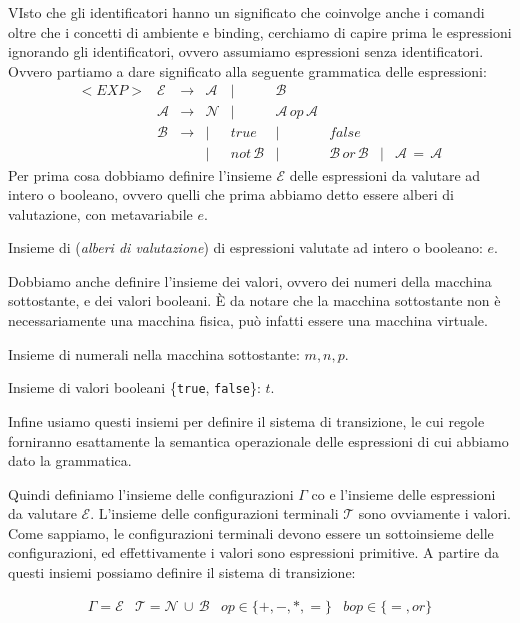 \documentclass[oneside,a4paper,11pt]{book}
\theoremstyle{italicstyle}
\theoremstyle{normStyle}
\begin{document}
VIsto che gli identificatori hanno un significato che coinvolge anche i comandi 
oltre che i concetti di ambiente e binding, cerchiamo di capire prima le espressioni 
ignorando gli identificatori, ovvero assumiamo espressioni senza identificatori.
Ovvero partiamo a dare significato alla seguente grammatica delle espressioni:
\[
\begin{matrix}
<EXP> & \mathcal{E} & \longrightarrow & \mathcal{A} & | & \mathcal{B}\\
      & \mathcal{A} & \longrightarrow & \mathcal{N} & | & \mathcal{A}\,op\,\mathcal{A}\\
      & \mathcal{B} & \longrightarrow & | & true & | & false \\
      & & &| & not \, \mathcal{B} & | &
      \mathcal{B} \,or\,\mathcal{B} & | & \mathcal{A} \,=\,\mathcal{A}
\end{matrix}
\]
Per prima cosa dobbiamo definire l'insieme $\mathcal{E}$ delle espressioni da valutare 
ad intero o booleano, ovvero quelli che prima abbiamo detto essere alberi di valutazione, 
con metavariabile $e$.
\begin{tcolorbox}[title = {Espressioni $\mathcal{E}$}]
  Insieme di (\textit{alberi di valutazione}) di espressioni valutate ad intero o booleano: $e$.
\end{tcolorbox}
Dobbiamo anche definire l'insieme dei valori, ovvero dei numeri della macchina
sottostante, e dei valori booleani. È da notare che la macchina sottostante non 
è necessariamente una macchina fisica, può infatti essere una macchina virtuale.
\begin{tcolorbox}[title = {Numeri $\mathcal{N}$}]
  Insieme di numerali nella macchina sottostante: $m,n,p$.
\end{tcolorbox}
\begin{tcolorbox}[title = {Booleani $\mathcal{B}$}]
  Insieme di valori booleani \{\verb|true|, \verb|false|\}: $t$.
\end{tcolorbox}
Infine usiamo questi insiemi per definire il sistema di transizione, le cui regole 
forniranno esattamente la semantica operazionale delle espressioni di cui abbiamo dato 
la grammatica.

Quindi definiamo l'insieme delle configurazioni $\Gamma$ co e l'insieme delle espressioni 
da valutare $\mathcal{E}$. L'insieme delle configurazioni terminali $\mathcal{T}$
sono ovviamente i valori. Come sappiamo, le configurazioni terminali devono essere un 
sottoinsieme delle configurazioni, ed effettivamente i valori sono espressioni primitive.
A partire da questi insiemi possiamo definire il sistema di transizione:
\begin{tcolorbox}[title ={Sistema di transizione}]
  \[
  \begin{matrix}
  \Gamma = \mathcal{E} & \mathcal{T} = \mathcal{N}\,\cup\,\mathcal{B} &
  op \in \{+,-,*,=\} &bop\in \{=,or\}  
  \end{matrix}
  \]
\end{tcolorbox}
\end{document}

